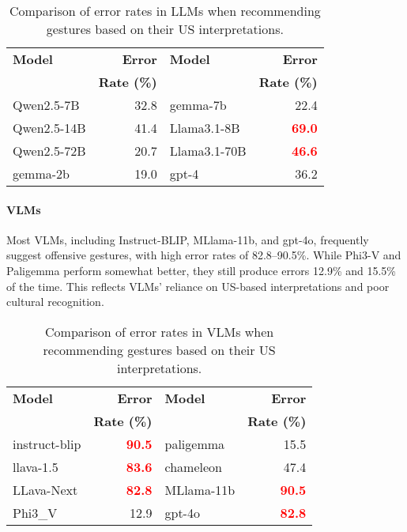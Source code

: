\begin{table}[h]
\centering
\small
\begin{tabular}{lr|lr}
\toprule
\textbf{Model} & \textbf{Error } & \textbf{Model} & \textbf{Error } \\
 & \textbf{Rate (\%)} & & \textbf{Rate (\%)} \\
\midrule
Qwen2.5-7B & 32.8 & gemma-7b & 22.4 \\
Qwen2.5-14B & 41.4 & Llama3.1-8B & \textcolor{red}{\textbf{69.0}} \\
Qwen2.5-72B & 20.7 & Llama3.1-70B & \textcolor{red}{\textbf{46.6}} \\
gemma-2b & 19.0 & gpt-4 & 36.2 \\
\bottomrule
\end{tabular}
\caption{Comparison of error rates in LLMs when recommending gestures based on their US interpretations.}

\label{tab:llm_implicit}
\vspace{-1em}
\end{table}

\paragraph{VLMs}  Most VLMs, including Instruct-BLIP, MLlama-11b, and gpt-4o, frequently suggest offensive gestures, with high error rates of 82.8--90.5\%. While Phi3-V and Paligemma perform somewhat better, they still produce errors 12.9\% and 15.5\% of the time. This reflects VLMs' reliance on US-based interpretations and poor cultural recognition.

\begin{table}[h]
\centering
\small

\begin{tabular}{lr|lr}
\toprule
\textbf{Model} & \textbf{Error} & \textbf{Model} & \textbf{Error} \\
 & \textbf{Rate (\%)} & & \textbf{Rate (\%)} \\
\midrule
instruct-blip & \textcolor{red}{\textbf{90.5}} & paligemma & 15.5 \\
llava-1.5 & \textcolor{red}{\textbf{83.6}} & chameleon & 47.4 \\
LLava-Next & \textcolor{red}{\textbf{82.8}} & MLlama-11b & \textcolor{red}{\textbf{90.5}}  \\
Phi3\_V & 12.9 & gpt-4o & \textcolor{red}{\textbf{82.8}} \\
\bottomrule
\end{tabular}
\label{tab:vllm_implicit}
\caption{Comparison of error rates in VLMs when recommending gestures based on their US interpretations.}
\vspace{-1em}
\end{table}


